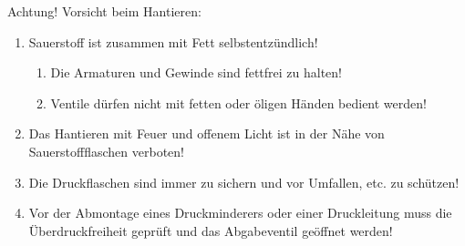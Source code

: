 % 
% 
\begin{Synopsis}
\end{Synopsis}

\bigskip

\begin{BoxRed}[title={\flushleft Sicherheitshinweise}]
	\begin{center}
	\end{center}
	\begin{Danger}
		\item Achtung! Vorsicht beim Hantieren: 
	\end{Danger}
	
	\begin{enumerate}
		\item Sauerstoff ist zusammen mit Fett selbstentzündlich!
		\begin{enumerate}
			\item Die Armaturen und Gewinde sind fettfrei zu
			halten!
			\item Ventile dürfen nicht mit fetten oder öligen
			Händen bedient werden!
		\end{enumerate}
		\item Das Hantieren mit Feuer und offenem
		Licht ist in der Nähe von Sauerstoffflaschen verboten!
		\item Die Druckflaschen sind immer zu sichern und vor
		Umfallen, etc. zu schützen!
		\item Vor der Abmontage eines
		Druckminderers oder einer Druckleitung muss die
		Überdruckfreiheit geprüft und das Abgabeventil geöffnet
		werden!
	\end{enumerate}
	
	\begin{center}
	\end{center}
\end{BoxRed}

